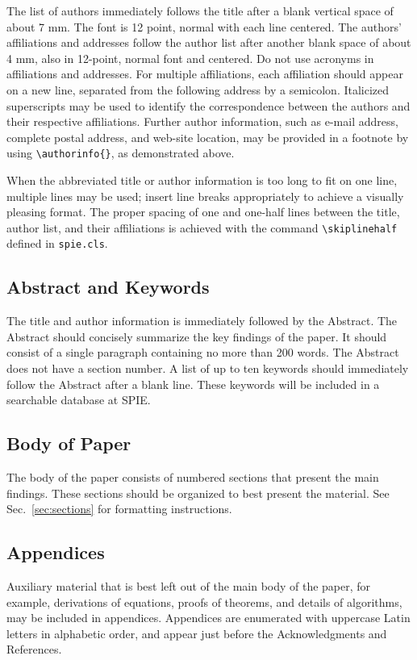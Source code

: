 \documentclass[a4paper]{spie}  %
\begin{document}
The list of authors immediately follows the title after a blank vertical space of about 7 mm.  The font is 12 point, normal with each line centered.  The authors' affiliations and addresses follow the author list after another blank space of about 4 mm, also in 12-point, normal font and centered.  Do not use acronyms in affiliations and addresses. For multiple affiliations, each affiliation should appear on a new line, separated from the following address by a semicolon.  Italicized superscripts may be used to identify the correspondence between the authors and their respective affiliations.  Further author information, such as e-mail address, complete postal address, and web-site location, may be provided in a footnote by using \verb|\authorinfo{}|, as demonstrated above.

When the abbreviated title or author information is too long to fit on one line, multiple lines may be used; insert line breaks appropriately to achieve a visually pleasing format.  The proper spacing of one and one-half lines between the title, author list, and their affiliations is achieved with the command \verb|\skiplinehalf| defined in {\tt spie.cls}.

\subsection{Abstract and Keywords} 
The title and author information is immediately followed by the Abstract. The Abstract should concisely summarize the key findings of the paper.  It should consist of a single paragraph containing no more than 200 words.  The Abstract does not have a section number.  A list of up to ten keywords should immediately follow the Abstract after a blank line.  These keywords will be included in a searchable database at SPIE.

\subsection{Body of Paper} 
The body of the paper consists of numbered sections that present the main findings.  These sections should be organized to best present the material.  See Sec.~\ref{sec:sections} for formatting instructions.

\subsection{Appendices} 
Auxiliary material that is best left out of the main body of the paper, for example, derivations of equations, proofs of theorems, and details of algorithms, may be included in appendices.  Appendices are enumerated with uppercase Latin letters in alphabetic order, and appear just before the Acknowledgments and References.
\end{document}
